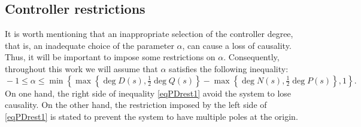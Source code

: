\documentclass[twoside,reqno,11pt]{fcaa-var} %
\begin{document}
\subsection{Controller restrictions}%
It is worth mentioning that an inappropriate selection of the controller degree, that is, an inadequate choice of the parameter $\alpha$, can cause a loss of causality. Thus, it will be important to impose some restrictions on $\alpha$. Consequently, throughout this work we will assume that $\alpha$ satisfies the following inequality:
\begin{equation}
	\!\!\!\!\!\!\!\!-1\leq\!\!\alpha\!\leq\min\!\left\{\!\max\!\left\{\!\deg D(s),\tfrac{1}{2}\deg Q(s)\right\}-\max\!\!\left\{\deg N(s),\tfrac{1}{2}\deg P(s)\right\}\!\!,1\right\}\!. \label{eqPDrest1}
\end{equation}
On one hand, the right side of inequality \eqref{eqPDrest1} avoid the system to lose causality. On the other hand, the restriction imposed by the left side of \eqref{eqPDrest1} is stated to prevent the system to have multiple poles at the origin.
\end{document}
